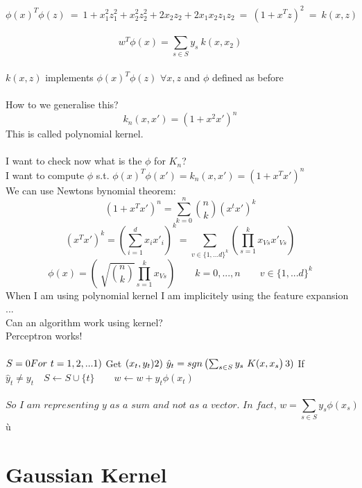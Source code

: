 \documentclass[../main.tex]{subfiles}
\begin{document}
$$
\phi(x)^T \phi(z) \ = \ 1+x_1^2 z_1^2 + x_2^2 z_2^2 + 2 x_2 z_2 + 2 x_1 x_2 z_1 z_2 \ = \ (1+x^T z ) ^2 \ = \ k(x,z)
$$\
$$
w^T\phi(x) = \sum_{s \in S} y_s \ k(x,x_2)
$$
\\
$k(x,z)$ implements $\phi(x)^T \phi(z)$ \quad $\forall x, z $ and $\phi$ defined as before
\\\\
How to we generalise this?
$$
k_n \left(x, x' \right) = (1+x^2 x' ) ^n
$$
This is called polynomial kernel.
\\\\
I want to check now what is the $\phi$ for $K_n$?
\\
I want to compute $\phi$ s.t. $\phi(x)^T \phi(x') = k_n(x,x') = (1+x^T x' ) ^n$
\\
We can use Newtons bynomial theorem:
\\
$$(1+x^T x')^n = \sum_{k=0}^n \binom{n}{k} (x^t x')^k $$
$$
(x^T x')^k = \left( \sum_{i=1}^{d} x_i x'_i \right)^k = \sum_{v \in \{ 1,...d \}^k} \left( \prod_{s=1}^{k} x_{Vs} x'_{Vs} \right)
$$
$$
\phi(x) = \left( \sqrt[]{\binom{n}{k}} \prod_{s=1}^{k} x_{Vs} \right) \qquad k = 0,..., n \qquad v \in \{1,...d\}^k
$$
When I am using polynomial kernel I am implicitely using the feature expansion ...
\\
Can an algorithm work using kernel?
\\
Perceptron works!
\\\\
$
S = 0 \\
For \ t = 1,2,... \\
1)$ Get $(x_t,y_t)\\
2) \  \hat{y}_t = sgn\left( \sum_{s \in S} y_s \ K(x ,x_s \right)
\\
3)
$
If $ \hat{y}_t \neq y_t \quad S \longleftarrow S \cup \{t\} \qquad w \leftarrow w + y_t \phi(x_t) $
\\\\
$$
\textit{So I am representing y as a sum and not as a vector. In fact, \ }  w = \sum_{s \in S} y_s \phi(x_s)$$ù

\section{Gaussian Kernel}
\end{document}
